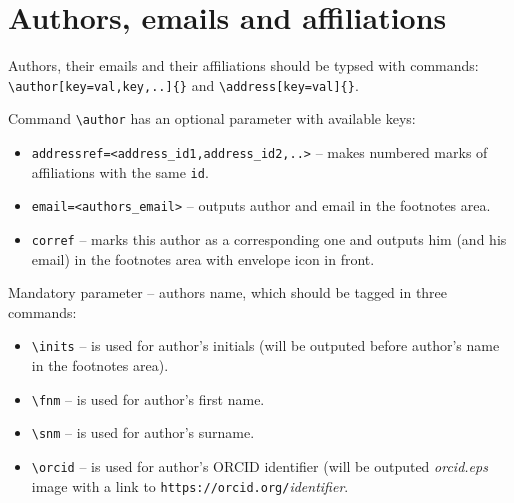 \documentclass[namedreferences,hyperref,optionalrh,solaromanenum]{spr-sola}
\begin{document}
%
%
%
%
%
%
%


%
%
% 
%   
%
%
%   
%  
\section{Authors, emails and affiliations}
\label{S-aug}
Authors, their emails and their affiliations should be typsed with commands: 
\verb+\author[key=val,key,..]{}+ and \verb+\address[key=val]{}+.

Command \verb+\author+  has an optional parameter with available keys: 
\begin{itemize}
\item \verb+addressref=<address_id1,address_id2,..>+ -- makes numbered marks of affiliations with the same \texttt{id}.
\item \verb+email=<authors_email>+ -- outputs author and email in the footnotes area.
\item \verb+corref+ -- marks this author as a corresponding one and outputs him (and his email) in the footnotes area with envelope icon in front. 
\end{itemize}
Mandatory parameter -- authors name, which should be tagged in three commands:
\begin{itemize}
\item \verb+\inits+ -- is used for author's initials (will be outputed before author's name in the footnotes area).
\item \verb+\fnm+ -- is used for author's first name.
\item \verb+\snm+ -- is used for author's surname.
\item \verb+\orcid+ -- is used for author's ORCID identifier (will be outputed \textit{orcid.eps} image with a link to \verb+https://orcid.org/+\textit{identifier}.
\end{itemize}
\end{document}
